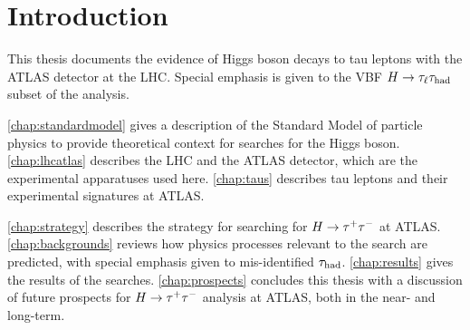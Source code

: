 \chapter[Introduction][Introduction]{Introduction}
\label{chap:introduction}

This thesis documents the evidence of Higgs boson decays to tau leptons with the ATLAS detector at the LHC. Special emphasis is given to the VBF $H\rightarrow\tau_\ell\tau_\text{had}$ subset of the analysis.

\cref{chap:standardmodel} gives a description of the Standard Model of particle physics to provide theoretical context for searches for the Higgs boson. \cref{chap:lhcatlas} describes the LHC and the ATLAS detector, which are the experimental apparatuses used here. \cref{chap:taus} describes tau leptons and their experimental signatures at ATLAS.

\cref{chap:strategy} describes the strategy for searching for ${H\rightarrow \tau^{+}\tau^{-}}$ at ATLAS. \cref{chap:backgrounds} reviews how physics processes relevant to the search are predicted, with special emphasis given to mis-identified $\tau_\text{had}$. \cref{chap:results} gives the results of the searches. \cref{chap:prospects} concludes this thesis with a discussion of future prospects for ${H\rightarrow \tau^{+}\tau^{-}}$ analysis at ATLAS, both in the near- and long-term.


